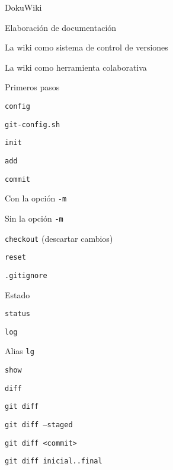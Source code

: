 \begin{longenum}
\begin{longenum}
\begin{longenum}
            \item DokuWiki \opcional\
            \begin{longenum}
                \item Elaboración de documentación
                \item La wiki como sistema de control de versiones
                \item La wiki como herramienta colaborativa
            \end{longenum}
        \end{longenum}
        \item Primeros pasos
        \begin{longenum}
            \item \texttt{config}
            \item \texttt{git-config.sh}
            \item \texttt{init}
            \item \texttt{add}
            \item \texttt{commit}
            \begin{longenum}
                \item Con la opción \texttt{-m}
                \item Sin la opción \texttt{-m}
            \end{longenum}
            \item \texttt{checkout} (descartar cambios)
            \item \texttt{reset}
            \item \texttt{.gitignore}
        \end{longenum}
        \item Estado
        \begin{longenum}
            \item \texttt{status}
            \item \texttt{log}
            \item Alias \texttt{lg}
            \item \texttt{show}
            \item \texttt{diff}
            \begin{longenum}
                \item \texttt{git diff}
                \item \texttt{git diff --staged}
                \item \texttt{git diff <commit>}
                \item \texttt{git diff inicial..final}

\end{longenum}
\end{longenum}
\end{longenum}
\end{longenum}
